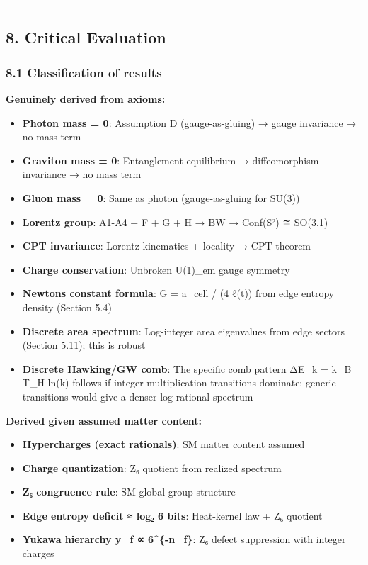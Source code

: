 \begin{center}\rule{0.5\linewidth}{0.5pt}\end{center}

\subsection{8. Critical Evaluation}\label{8-critical-evaluation}

\subsubsection{8.1 Classification of results}\label{81-classification-of-results}

\textbf{Genuinely derived from axioms:}

\begin{itemize}
\tightlist
\item
  \textbf{Photon mass = 0}: Assumption D (gauge-as-gluing) → gauge invariance → no mass term
\item
  \textbf{Graviton mass = 0}: Entanglement equilibrium → diffeomorphism invariance → no mass term
\item
  \textbf{Gluon mass = 0}: Same as photon (gauge-as-gluing for SU(3))
\item
  \textbf{Lorentz group}: A1-A4 + F + G + H → BW → Conf(S²) ≅ SO(3,1)
\item
  \textbf{CPT invariance}: Lorentz kinematics + locality → CPT theorem
\item
  \textbf{Charge conservation}: Unbroken U(1)\_em gauge symmetry
\item
  \textbf{Newton\textquotesingle s constant formula}: G = a\_cell / (4 \={ℓ}(t)) from edge entropy density (Section 5.4)
\item
  \textbf{Discrete area spectrum}: Log-integer area eigenvalues from edge sectors (Section 5.11); this is robust
\item
  \textbf{Discrete Hawking/GW comb}: The specific comb pattern ΔE\_k = k\_B T\_H ln(k) follows if integer-multiplication transitions dominate; generic transitions would give a denser log-rational spectrum
\end{itemize}

\textbf{Derived given assumed matter content:}

\begin{itemize}
\tightlist
\item
  \textbf{Hypercharges (exact rationals)}: SM matter content assumed
\item
  \textbf{Charge quantization}: Z₆ quotient from realized spectrum
\item
  \textbf{Z₆ congruence rule}: SM global group structure
\item
  \textbf{Edge entropy deficit ≈ log₂ 6 bits}: Heat-kernel law + Z₆ quotient
\item
  \textbf{Yukawa hierarchy y\_f ∝ 6\^{}\{-n\_f\}}: Z₆ defect suppression with integer charges
\end{itemize}

